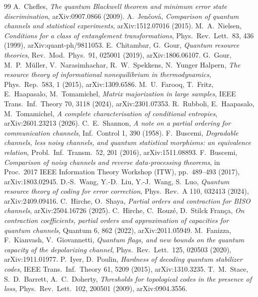 \documentclass[a4paper,11pt]{article}
\theoremstyle{plain}
\theoremstyle{definition}
\theoremstyle{remark}
\begin{document}
\begin{thebibliography}{99}
 A.~Chefles, \emph{The quantum Blackwell theorem and minimum error state discrimination}, arXiv:0907.0866 (2009).
 A.~Jen\v{c}ov\'a, \emph{Comparison of quantum channels and statistical experiments}, arXiv:1512.07016 (2015).
 M.~A.~Nielsen, \emph{Conditions for a class of entanglement transformations}, Phys.\ Rev.\ Lett.\ 83, 436 (1999), arXiv:quant-ph/9811053.
 E.~Chitambar, G.~Gour, \emph{Quantum resource theories}, Rev.\ Mod.\ Phys.\ 91, 025001 (2019), arXiv:1806.06107.
 G.~Gour, M.~P.~M\"uller, V.~Narasimhachar, R.~W.~Spekkens, N.~Yunger Halpern, \emph{The resource theory of informational nonequilibrium in thermodynamics}, Phys.\ Rep.\ 583, 1 (2015), arXiv:1309.6586.
 M.~U.~Farooq, T.~Fritz, E.~Haapasalo, M.~Tomamichel, \emph{Matrix majorization in large samples}, IEEE Trans.\ Inf.\ Theory 70, 3118 (2024), arXiv:2301.07353.
 R.~Rubboli, E.~Haapasalo, M.~Tomamichel, \emph{A complete characterisation of conditional entropies}, arXiv:2601.23213 (2026).
 C.~E.~Shannon, \emph{A note on a partial ordering for communication channels}, Inf.\ Control 1, 390 (1958).
 F.~Buscemi, \emph{Degradable channels, less noisy channels, and quantum statistical morphisms: an equivalence relation}, Probl.\ Inf.\ Transm.\ 52, 201 (2016), arXiv:1511.08893.
 F.~Buscemi, \emph{Comparison of noisy channels and reverse data-processing theorems}, in Proc.\ 2017 IEEE Information Theory Workshop (ITW), pp.~489--493 (2017), arXiv:1803.02945.
 D.-S.~Wang, Y.-D.~Liu, Y.-J.~Wang, S.~Luo, \emph{Quantum resource theory of coding for error correction}, Phys.\ Rev.\ A 110, 032413 (2024), arXiv:2409.09416.
 C.~Hirche, O.~Shaya, \emph{Partial orders and contraction for BISO channels}, arXiv:2504.16726 (2025).
 C.~Hirche, C.~Rouz\'e, D.~Stilck Fran\c{c}a, \emph{On contraction coefficients, partial orders and approximation of capacities for quantum channels}, Quantum 6, 862 (2022), arXiv:2011.05949.
 M.~Fanizza, F.~Kianvash, V.~Giovannetti, \emph{Quantum flags, and new bounds on the quantum capacity of the depolarizing channel}, Phys.\ Rev.\ Lett.\ 125, 020503 (2020), arXiv:1911.01977.
 P.~Iyer, D.~Poulin, \emph{Hardness of decoding quantum stabilizer codes}, IEEE Trans.\ Inf.\ Theory 61, 5209 (2015), arXiv:1310.3235.
 T.~M.~Stace, S.~D.~Barrett, A.~C.~Doherty, \emph{Thresholds for topological codes in the presence of loss}, Phys.\ Rev.\ Lett.\ 102, 200501 (2009), arXiv:0904.3556.

\end{thebibliography}
\end{document}
